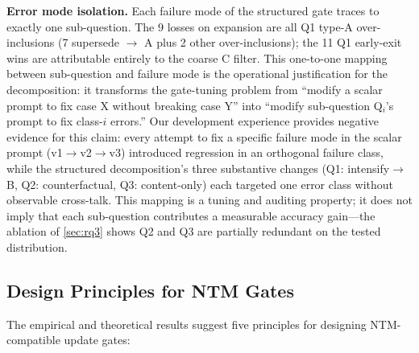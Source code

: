 \documentclass{article}
\theoremstyle{definition}
\begin{document}
\textbf{Error mode isolation.}  Each failure mode of the structured
gate traces to exactly one sub-question.  The 9 losses on
expansion are all Q1 type-A over-inclusions (7 supersede $\to$ A plus 2
other over-inclusions); the 11 Q1 early-exit wins are attributable
entirely to the coarse C filter.  This one-to-one mapping between
sub-question and failure mode is the operational justification for
the decomposition: it transforms the gate-tuning problem from
``modify a scalar prompt to fix case X without breaking case Y'' into
``modify sub-question Q$_i$'s prompt to fix class-$i$ errors.''  Our
development experience provides negative evidence for this claim: every attempt
to fix a specific failure mode in the scalar prompt (v1$\to$v2$\to$v3)
introduced regression in an orthogonal failure class, while the
structured decomposition's three substantive changes
(Q1: intensify$\to$B, Q2: counterfactual, Q3: content-only) each
targeted one error class without observable cross-talk.  This mapping is
a tuning and auditing property; it does not imply that each sub-question
contributes a measurable accuracy gain---the ablation of \cref{sec:rq3}
shows Q2 and Q3 are partially redundant on the tested distribution.

\subsection{Design Principles for NTM Gates}

The empirical and theoretical results suggest five principles for
designing NTM-compatible update gates:
\end{document}
